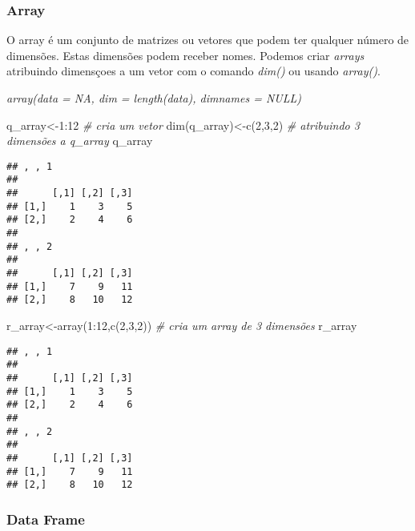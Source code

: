\documentclass[
]{book}
\newenvironment{Shaded}{\begin{snugshade}}{\end{snugshade}}
\newcommand{\CommentTok}[1]{\textcolor[rgb]{0.56,0.35,0.01}{\textit{#1}}}
\newcommand{\DecValTok}[1]{\textcolor[rgb]{0.00,0.00,0.81}{#1}}
\newcommand{\FunctionTok}[1]{\textcolor[rgb]{0.00,0.00,0.00}{#1}}
\newcommand{\NormalTok}[1]{#1}
\newcommand{\OtherTok}[1]{\textcolor[rgb]{0.56,0.35,0.01}{#1}}
\newcommand{\SpecialCharTok}[1]{\textcolor[rgb]{0.00,0.00,0.00}{#1}}
\begin{document}
\hypertarget{array}{%
\subsubsection{Array}\label{array}}

O array é um conjunto de matrizes ou vetores que podem ter qualquer número de dimensões. Estas dimensões podem receber nomes.
Podemos criar \emph{arrays} atribuindo dimensçoes a um vetor com o comando \emph{dim()} ou usando \emph{array()}.

\emph{\emph{array(data = NA, dim = length(data), dimnames = NULL)}}

\begin{Shaded}
\begin{Highlighting}[]
\NormalTok{q\_array}\OtherTok{\textless{}{-}}\DecValTok{1}\SpecialCharTok{:}\DecValTok{12} \CommentTok{\# cria um vetor}
\FunctionTok{dim}\NormalTok{(q\_array)}\OtherTok{\textless{}{-}}\FunctionTok{c}\NormalTok{(}\DecValTok{2}\NormalTok{,}\DecValTok{3}\NormalTok{,}\DecValTok{2}\NormalTok{) }\CommentTok{\# atribuindo 3 dimensões a q\_array}
\NormalTok{q\_array}
\end{Highlighting}
\end{Shaded}

\begin{verbatim}
## , , 1
## 
##      [,1] [,2] [,3]
## [1,]    1    3    5
## [2,]    2    4    6
## 
## , , 2
## 
##      [,1] [,2] [,3]
## [1,]    7    9   11
## [2,]    8   10   12
\end{verbatim}

\begin{Shaded}
\begin{Highlighting}[]
\NormalTok{r\_array}\OtherTok{\textless{}{-}}\FunctionTok{array}\NormalTok{(}\DecValTok{1}\SpecialCharTok{:}\DecValTok{12}\NormalTok{,}\FunctionTok{c}\NormalTok{(}\DecValTok{2}\NormalTok{,}\DecValTok{3}\NormalTok{,}\DecValTok{2}\NormalTok{)) }\CommentTok{\# cria um array de 3 dimensões}
\NormalTok{r\_array}
\end{Highlighting}
\end{Shaded}

\begin{verbatim}
## , , 1
## 
##      [,1] [,2] [,3]
## [1,]    1    3    5
## [2,]    2    4    6
## 
## , , 2
## 
##      [,1] [,2] [,3]
## [1,]    7    9   11
## [2,]    8   10   12
\end{verbatim}

\hypertarget{data-frame}{%
\subsubsection{Data Frame}\label{data-frame}}
\end{document}
